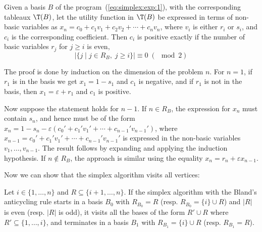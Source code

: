 \begin{lema}
  \label{lm:simplex:exp:1}
  Given a basis $B$ of the program~(\ref{eq:simplex:exp:1}), with the corresponding tableaux $\T(B)$,
  let the utility function in $\T(B)$ be expressed in terms of non-basic variables as 
  $x_n=c_0+c_1v_1+c_2v_2+\cdots+c_nv_n$, where  $v_i$  is either $r_i$ or  $s_i$, and $c_i$ is the
  corresponding
  coefficient. Then $c_i$ is positive exactly if the number of basic variables $r_j$ for $j\ge i$ is
  even, \ie
  $$\left|\{j\mid j\in R_B,\;j\ge i\}\right|\equiv 0\; (\mod 2)$$
\end{lema}

\begin{dokaz}
  The proof is done by induction on the dimension of the problem $n$. For $n=1$, if $r_1$ is in the
  basis we get  $x_1=1-s_1$ and $c_1$ is negative, and if $r_1$ is not in the basis, then $x_1=\varepsilon+r_1$ 
  and $c_1$ is positive.

  \noindent
  Now suppose the statement holds for $n-1$. If $n\in R_B$, the expression for $x_n$ must
  contain $s_n$, and hence must be of the form $x_n=1-s_n-\varepsilon (c_0'+c_1'v_1'+\cdots+c_{n-1}'v_{n-1}')$,
  where $x_{n-1}=c_0'+c_1'v_1'+\cdots+c_{n-1}'v_{n-1}'$ is expressed in the non-basic variables
  $v_1,\ldots,v_{n-1}$. The result follows by expanding and applying the induction hypothesis.
  If $n\not\in R_B$, the approach is similar using the equality $x_n=r_n+\varepsilon x_{n-1}$.
\end{dokaz}

\noindent
Now we can show that the simplex algorithm visits all vertices:

\begin{veta}
  Let $i\in\{1,\ldots,n\}$ and 
  $R\subseteq\{i+1,\ldots,n\}$. 
  If the simplex algorithm with the Bland's anticycling rule starts in a basis $B_0$ with
  $R_{B_0}=R$ 
  (resp. $R_{B_0}=\{i\}\cup R$) and $|R|$ is even (resp. $|R|$ is odd),
  it visits all the bases of the form  $R'\cup R$ where $R'\subseteq\{1,\ldots,i\}$, and
  terminates in a basis $B_1$ with $R_{B_1}=\{i\}\cup R$ (resp. $R_{B_1}=R$).
\end{veta}

